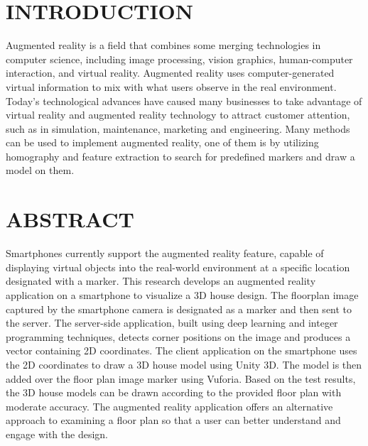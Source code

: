 \documentclass[12pt]{article}
\begin{document}
\tableofcontents
\pagestyle{fancy}
\fancyhead{} %
\fancyfoot{} %

\section{\large{INTRODUCTION}}
Augmented reality is a field that combines some merging technologies in computer science, including image processing, vision graphics, human-computer interaction, and virtual reality. Augmented reality uses computer-generated virtual information to mix with what users observe in the real environment. Today’s technological advances have caused many businesses to take advantage of virtual reality and augmented reality technology to attract customer attention, such as in simulation, maintenance, marketing and engineering. Many methods can be used to implement augmented reality, one of them is by utilizing homography and feature extraction to search for predefined markers and draw a model on them.

\section{\large{ABSTRACT}}
Smartphones currently support the augmented reality feature, capable of displaying virtual objects into the real-world environment at a specific location designated with a marker. This research develops an augmented reality application on a smartphone to visualize a 3D house design. The floorplan image captured by the smartphone camera is designated as a marker and then sent to the server. The server-side application, built using deep learning and integer programming techniques, detects corner positions on the image and produces a vector containing 2D coordinates. The client application on the smartphone uses the 2D coordinates to draw a 3D house model using Unity 3D. The model is then added over the floor plan image marker using Vuforia. Based on the test results, the 3D house models can be drawn according to the provided floor plan with moderate accuracy. The augmented reality application offers an alternative approach to examining a floor plan so that a user can better understand and engage with the design.
\end{document}
